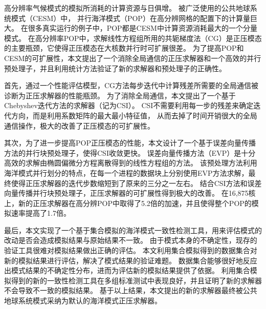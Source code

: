 \begin{cabstract}
  高分辨率气候模式的模拟所消耗的计算资源与日俱增。 
  被广泛使用的公共地球系统模式（CESM）中， 并行海洋模式（POP）在高分辨网格的配置下的计算量巨大。
  在很多真实运行的例子中，POP都是CESM中计算资源消耗最大的一个分量模式。 
  在高分辨率POP中，求解线性方程组所用的共轭梯度法（CG）是正压模态的主要瓶颈，它使得正压模态在大核数并行时可扩展很差。
  为了提高POP和CESM的可扩展性，本文提出了一个消除全局通信的正压求解器和一个高效的并行预处理子，并且利用统计方法验证了新的求解器和预处理子的正确性。

  首先，通过一个性能评估模型，CG方法每步迭代中计算残差所需要的全局通信被诊断为正压求解器的性能瓶颈。 
  为了消除全局通信，本文提出了一个基于Chebyshev迭代方法的求解器（记为CSI）。
  CSI不需要利用每一步的残差来确定迭代方向，而是利用系数矩阵的最大最小特征值，
  从而去掉了时间开销很大的全局通信操作，极大的改善了正压模态的可扩展性。

  其次，为了进一步提高POP正压模态的性能，本文设计了一个基于误差向量传播方法的并行块预处理子，使得CSI收敛更快。 
  误差向量传播方法（EVP）是十分高效的求解由椭圆偏微分方程离散得到的线性方程组的方法。
  该预处理方法利用海洋模式并行划分的特点，在每一个进程的数据块上分别使用EVP方法求解，最终使得正压求解器的迭代步数缩短到了原来的三分之一左右。 
  结合CSI方法和误差向量传播并行块预处理子，正压求解器的可扩展性得到极大的改善。 在16,875核上，新的正压求解器在高分辨POP中取得了5.2倍的加速，并且使得整个POP的模拟速率提高了1.7倍。 
  

  最后，本文实现了一个基于集合模拟的海洋模式一致性检测工具，用来评估模式的改动是否会造成模拟结果与原始结果不一致。
  由于模式本身的不确定性，现存的验证工具很难对模拟结果做出正确的评估。
  本文利用集合模拟得到的数据集合对新的模拟结果进行评估，解决了模式结果的验证难题。 
  数据集合能够很好地反应出模式结果的不确定性分布，进而为评估新的模拟结果提供了依据。  
  利用集合模拟得到的新的一致性检测工具在多组标准测试中表现良好，并且证明了新的求解器不会导致不一致的模拟结果。
  基于以上结果，本文提出的新的求解器最终被公共地球系统模式采纳为默认的海洋模式正压求解器。

\end{cabstract}


